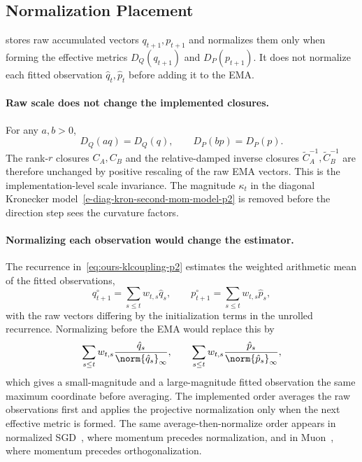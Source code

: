 \subsection{Normalization Placement}
\label{sec:scale-placement-p2}

\methodname{} stores raw accumulated vectors $q_{t+1},p_{t+1}$ and normalizes
them only when forming the effective metrics $D_Q(q_{t+1})$ and
$D_P(p_{t+1})$. It does not normalize each fitted observation
$\hat q_t,\hat p_t$ before adding it to the EMA.

\paragraph{Raw scale does not change the implemented closures.}
For any $a,b>0$,
\[
  D_Q(aq)=D_Q(q),
  \qquad
  D_P(bp)=D_P(p).
\]
The rank-$r$ closures $C_A,C_B$ and the relative-damped inverse closures
$\widetilde C_A^{-1},\widetilde C_B^{-1}$ are therefore unchanged by
positive rescaling of the raw EMA vectors. This is the implementation-level
scale invariance. The magnitude $\kappa_t$ in the diagonal Kronecker
model~\eqref{e-diag-kron-second-mom-model-p2} is removed before the
direction step sees the curvature factors.

\paragraph{Normalizing each observation would change the estimator.}
The recurrence in~\eqref{eq:ours-klcoupling-p2} estimates the weighted
arithmetic mean of the fitted observations,
\[
  q^\circ_{t+1}=\sum_{s\le t}w_{t,s}\hat q_s,
  \qquad
  p^\circ_{t+1}=\sum_{s\le t}w_{t,s}\hat p_s,
\]
with the raw vectors differing by the initialization terms in the unrolled
recurrence. Normalizing before the EMA would replace this by
\[
  \sum_{s\le t}w_{t,s}\frac{\hat q_s}{\norm{\hat q_s}_\infty},
  \qquad
  \sum_{s\le t}w_{t,s}\frac{\hat p_s}{\norm{\hat p_s}_\infty},
\]
which gives a small-magnitude and a large-magnitude fitted observation the
same maximum coordinate before averaging. The implemented order averages the
raw observations first and applies the projective normalization only when the
next effective metric is formed. The same average-then-normalize order appears
in normalized SGD~\cite{cutkosky_nigt}, where momentum precedes
normalization, and in Muon~\cite{denoise_ortho}, where momentum precedes
orthogonalization.
